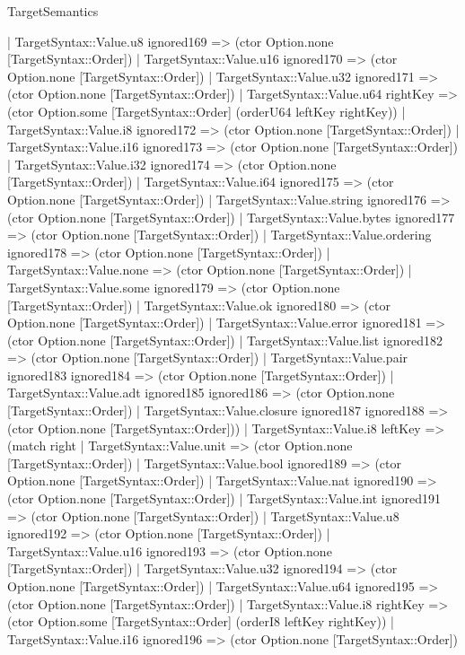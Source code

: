 \begin{lexlean}{TargetSemantics}
\begin{semanticmodule}
{      | TargetSyntax::Value.u8 ignored169 => (ctor Option.none [TargetSyntax::Order])
      | TargetSyntax::Value.u16 ignored170 => (ctor Option.none [TargetSyntax::Order])
      | TargetSyntax::Value.u32 ignored171 => (ctor Option.none [TargetSyntax::Order])
      | TargetSyntax::Value.u64 rightKey => (ctor Option.some [TargetSyntax::Order] (orderU64 leftKey rightKey))
      | TargetSyntax::Value.i8 ignored172 => (ctor Option.none [TargetSyntax::Order])
      | TargetSyntax::Value.i16 ignored173 => (ctor Option.none [TargetSyntax::Order])
      | TargetSyntax::Value.i32 ignored174 => (ctor Option.none [TargetSyntax::Order])
      | TargetSyntax::Value.i64 ignored175 => (ctor Option.none [TargetSyntax::Order])
      | TargetSyntax::Value.string ignored176 => (ctor Option.none [TargetSyntax::Order])
      | TargetSyntax::Value.bytes ignored177 => (ctor Option.none [TargetSyntax::Order])
      | TargetSyntax::Value.ordering ignored178 => (ctor Option.none [TargetSyntax::Order])
      | TargetSyntax::Value.none => (ctor Option.none [TargetSyntax::Order])
      | TargetSyntax::Value.some ignored179 => (ctor Option.none [TargetSyntax::Order])
      | TargetSyntax::Value.ok ignored180 => (ctor Option.none [TargetSyntax::Order])
      | TargetSyntax::Value.error ignored181 => (ctor Option.none [TargetSyntax::Order])
      | TargetSyntax::Value.list ignored182 => (ctor Option.none [TargetSyntax::Order])
      | TargetSyntax::Value.pair ignored183 ignored184 => (ctor Option.none [TargetSyntax::Order])
      | TargetSyntax::Value.adt ignored185 ignored186 => (ctor Option.none [TargetSyntax::Order])
      | TargetSyntax::Value.closure ignored187 ignored188 => (ctor Option.none [TargetSyntax::Order]))
    | TargetSyntax::Value.i8 leftKey => (match right
      | TargetSyntax::Value.unit => (ctor Option.none [TargetSyntax::Order])
      | TargetSyntax::Value.bool ignored189 => (ctor Option.none [TargetSyntax::Order])
      | TargetSyntax::Value.nat ignored190 => (ctor Option.none [TargetSyntax::Order])
      | TargetSyntax::Value.int ignored191 => (ctor Option.none [TargetSyntax::Order])
      | TargetSyntax::Value.u8 ignored192 => (ctor Option.none [TargetSyntax::Order])
      | TargetSyntax::Value.u16 ignored193 => (ctor Option.none [TargetSyntax::Order])
      | TargetSyntax::Value.u32 ignored194 => (ctor Option.none [TargetSyntax::Order])
      | TargetSyntax::Value.u64 ignored195 => (ctor Option.none [TargetSyntax::Order])
      | TargetSyntax::Value.i8 rightKey => (ctor Option.some [TargetSyntax::Order] (orderI8 leftKey rightKey))
      | TargetSyntax::Value.i16 ignored196 => (ctor Option.none [TargetSyntax::Order])
}
\end{semanticmodule}
\end{lexlean}
